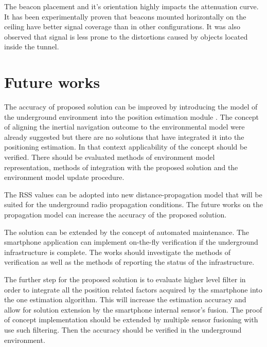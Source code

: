 \documentclass[../main.tex]{subfiles}
\begin{document}
The beacon placement and it's orientation highly impacts the attenuation curve. It has been experimentally proven that beacons mounted horizontally on the ceiling have better signal coverage than in other configurations. It was also observed that signal is less prone to the distortions caused by objects located inside the tunnel.



\section{Future works} %
\label{sec:future_works}

The accuracy of proposed solution can be improved by introducing the model of the underground environment into the position estimation module \cite{positioning_tests}. The concept of aligning the inertial navigation outcome to the environmental model were already suggested but there are no solutions that have integrated it into the positioning estimation. In that context applicability of the concept should be verified. There should be evaluated methods of environment model representation, methods of integration with the proposed solution and the environment model update procedure.

The RSS values can be adopted into new distance-propagation model that will be suited for the underground radio propagation conditions. The future works on the propagation model can increase the accuracy of the proposed solution.

The solution can be extended by the concept of automated maintenance. The smartphone application can implement on-the-fly verification if the underground infrastructure is complete. The works should investigate the methods of verification as well as the methods of reporting the status of the infrastructure.

The further step for the proposed solution is to evaluate higher level filter in order to integrate all the position related factors acquired by the smartphone into the one estimation algorithm. This will increase the estimation accuracy and allow for solution extension by the smartphone internal sensor's fusion. The proof of concept implementation should be extended by multiple sensor fusioning with use such filtering. Then the accuracy should be verified in the underground environment.

\end{document}
